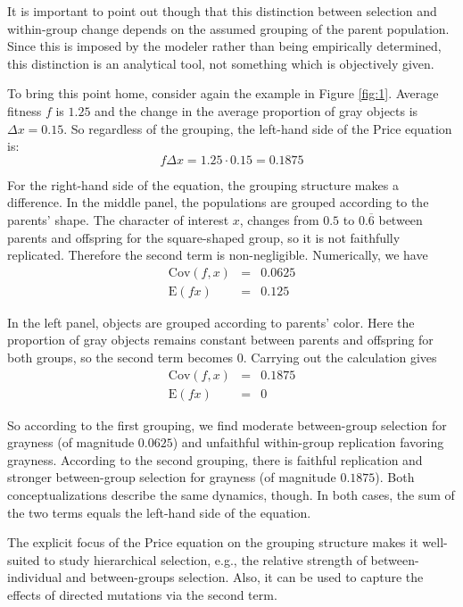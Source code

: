 \documentclass[output=paper,hidelinks]{langscibook}
\begin{document}
It is important to point out though that this distinction between selection and
within-group change depends on the assumed grouping of the parent population. Since this
is imposed by the modeler rather than being empirically determined, this distinction is an
analytical tool, not something which is objectively given.

To bring this point home, consider again the example in Figure \ref{fig:1}. Average
fitness $f$ is $1.25$ and the change in the average proportion of gray objects is
$\Delta x = 0.15$. So regardless of the grouping, the left-hand side of the Price equation
is:
\[f\Delta x = 1.25 \cdot 0.15 = 0.1875\]

For the right-hand side of the equation, the grouping structure makes a difference.  In
the middle panel, the populations are grouped according to the parents' shape. The
character of interest $x$, changes from $0.5$ to $0.\overline{6}$ between parents and
offspring for the square-shaped group, so it is not faithfully replicated. Therefore the
second term is non-negligible. Numerically, we have
\begin{eqnarray*}
  \mathrm{Cov}(f, x) &=& 0.0625\\
  \mathrm{E}(f x) &=& 0.125
\end{eqnarray*}

In the left panel, objects are grouped according to parents' color. Here the proportion of
gray objects remains constant between parents and offspring for both groups, so the second
term becomes $0$. Carrying out the calculation gives
\begin{eqnarray*}
  \mathrm{Cov}(f, x) &=& 0.1875\\
  \mathrm{E}(f x) &=& 0
\end{eqnarray*}\largerpage[-1]

So according to the first grouping, we find moderate between-group selection for grayness
(of magnitude $0.0625$) and unfaithful within-group replication favoring
grayness. According to the second grouping, there is faithful replication and stronger
between-group selection for grayness (of magnitude $0.1875$). Both conceptualizations
describe the same dynamics, though. In both cases, the sum of the two terms equals the
left-hand side of the equation.

The explicit focus of the Price equation on the grouping structure makes it well-suited to
study hierarchical selection, e.g., the relative strength of between-individual and
between-groups selection. Also, it can be used to capture the effects of directed
mutations via the second term.
\end{document}
